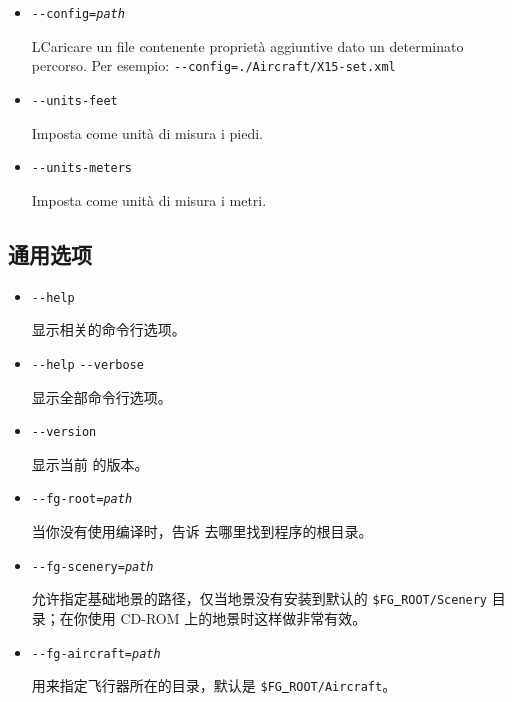 \begin{itemize}
{\begin{itemize}
  \item{\texttt{-$ $-config={\it path}}}

    LCaricare un file contenente propriet\`{a} aggiuntive dato un determinato percorso. Per esempio:
    \texttt{-$ $-config=./Aircraft/X15-set.xml}

  \item{\texttt{-$ $-units-feet}}

    Imposta come unit\`{a} di misura i piedi.

  \item{\texttt{-$ $-units-meters}}

    Imposta come unit\`{a} di misura i metri.


  \end{itemize}
}

\ifchinese
{
\subsection{通用选项}\label{generaloptions}
\begin{itemize}
\item{\texttt{-$ $-help}}

  显示相关的命令行选项。

\item{\texttt{-$ $-help} \texttt{-$ $-verbose}}

  显示全部命令行选项。

\item{\texttt{-$ $-version} }

  显示当前 \FlightGear{} 的版本。

\item{\texttt{-$ $-fg-root={\it path}}}

  当你没有使用编译时，告诉 \FlightGear{} 去哪里找到程序的根目录。

\item{\texttt{-$ $-fg-scenery={\it path}}}

  允许指定基础地景的路径，仅当地景没有安装到默认的 \texttt{\$FG\underline{~}ROOT/Scenery} 目录；在你使用 CD-ROM 上的地景时这样做非常有效。

\item{\texttt{-$ $-fg-aircraft={\it path}}}

  用来指定飞行器所在的目录，默认是 \texttt{\$FG\underline{~}ROOT/Aircraft}。


\end{itemize}}
\end{itemize}
